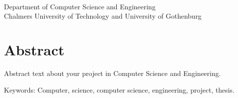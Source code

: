 \titleA{}\\
\titleB{}\\
\me{}\\
Department of Computer Science and Engineering\\
Chalmers University of Technology and University of Gothenburg\setlength{\parskip}{0.5cm}

\thispagestyle{plain}			%
\setlength{\parskip}{0pt plus 1.0pt}
\section*{Abstract}
Abstract text about your project in  Computer Science and Engineering.

\vfill
Keywords: Computer, science, computer science, engineering, project, thesis.

\newpage				%
\thispagestyle{empty}
\mbox{}

